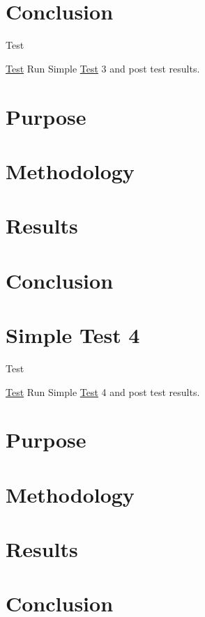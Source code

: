 \section*{Conclusion}

\begin{DoxyRefDesc}{Test}
\item[\hyperlink{test__test000016}{Test}]Run Simple \hyperlink{class_test}{Test} 3 and post test results.\end{DoxyRefDesc}


\section*{Purpose}

\section*{Methodology}

\section*{Results}

\section*{Conclusion}\hypertarget{SimpleTest4}{}\section{Simple Test 4}\label{SimpleTest4}
\begin{DoxyRefDesc}{Test}
\item[\hyperlink{test__test000008}{Test}]Run Simple \hyperlink{class_test}{Test} 4 and post test results.\end{DoxyRefDesc}


\section*{Purpose}

\section*{Methodology}

\section*{Results}

\section*{Conclusion}


